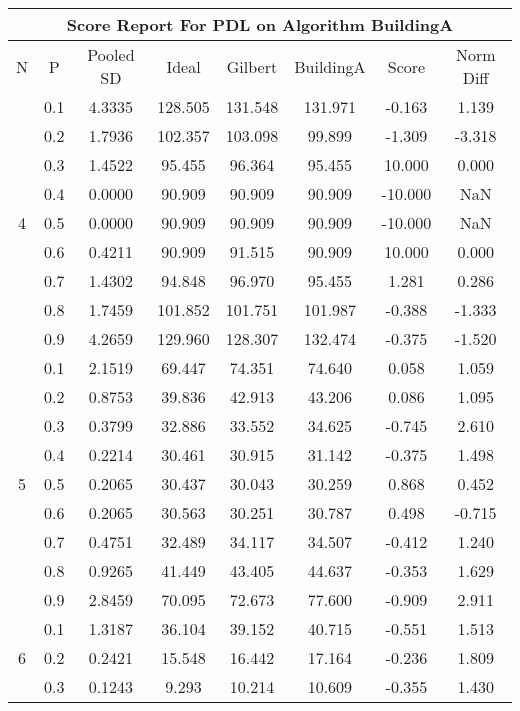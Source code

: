 \documentclass[11pt,a4paper]{report}
\begin{document}
\begin{longtable}{ | c | c || c | c | c | c | c | c | }
\hline
\multicolumn{8}{|c|}{ Score Report For PDL on Algorithm BuildingA} \\
\hline
N & P & Pooled SD &  Ideal &  Gilbert & BuildingA  & Score & Norm Diff \\
 \hline
 \hline
 \endhead
\multirow{9}{*}{4} & 0.1 & 4.3335 & 128.505 & 131.548 & 131.971 & -0.163 & 1.139 \\
 & 0.2 & 1.7936 & 102.357 & 103.098 & 99.899 & -1.309 & -3.318 \\
 & 0.3 & 1.4522 & 95.455 & 96.364 & 95.455 & 10.000 & 0.000 \\
 & 0.4 & 0.0000 & 90.909 & 90.909 & 90.909 & -10.000 & NaN \\
 & 0.5 & 0.0000 & 90.909 & 90.909 & 90.909 & -10.000 & NaN \\
 & 0.6 & 0.4211 & 90.909 & 91.515 & 90.909 & 10.000 & 0.000 \\
 & 0.7 & 1.4302 & 94.848 & 96.970 & 95.455 & 1.281 & 0.286 \\
 & 0.8 & 1.7459 & 101.852 & 101.751 & 101.987 & -0.388 & -1.333 \\
 & 0.9 & 4.2659 & 129.960 & 128.307 & 132.474 & -0.375 & -1.520 \\
 \hline
\multirow{9}{*}{5} & 0.1 & 2.1519 & 69.447 & 74.351 & 74.640 & 0.058 & 1.059 \\
 & 0.2 & 0.8753 & 39.836 & 42.913 & 43.206 & 0.086 & 1.095 \\
 & 0.3 & 0.3799 & 32.886 & 33.552 & 34.625 & -0.745 & 2.610 \\
 & 0.4 & 0.2214 & 30.461 & 30.915 & 31.142 & -0.375 & 1.498 \\
 & 0.5 & 0.2065 & 30.437 & 30.043 & 30.259 & 0.868 & 0.452 \\
 & 0.6 & 0.2065 & 30.563 & 30.251 & 30.787 & 0.498 & -0.715 \\
 & 0.7 & 0.4751 & 32.489 & 34.117 & 34.507 & -0.412 & 1.240 \\
 & 0.8 & 0.9265 & 41.449 & 43.405 & 44.637 & -0.353 & 1.629 \\
 & 0.9 & 2.8459 & 70.095 & 72.673 & 77.600 & -0.909 & 2.911 \\
 \hline
\multirow{9}{*}{6} & 0.1 & 1.3187 & 36.104 & 39.152 & 40.715 & -0.551 & 1.513 \\
 & 0.2 & 0.2421 & 15.548 & 16.442 & 17.164 & -0.236 & 1.809 \\
 & 0.3 & 0.1243 & 9.293 & 10.214 & 10.609 & -0.355 & 1.430 \\

\end{longtable}
\end{document}
